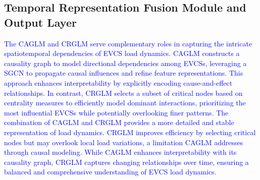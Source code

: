 \documentclass[lettersize,journal]{IEEEtran}
\newcommand{\hl}[1]{\textcolor{blue}{#1}}
\begin{document}
\subsection{Temporal Representation Fusion Module and Output Layer}


\hl{The CAGLM and CRGLM serve complementary roles in capturing the intricate spatiotemporal dependencies of EVCS load dynamics. CAGLM constructs a causality graph to model directional dependencies among EVCSs, leveraging a SGCN to propagate causal influences and refine feature representations. This approach enhances interpretability by explicitly encoding cause-and-effect relationships. In contrast, CRGLM selects a subset of critical nodes based on centrality measures to efficiently model dominant interactions, prioritizing the most influential EVCSs while potentially overlooking finer patterns.
The combination of CAGLM and CRGLM provides a more detailed and stable representation of load dynamics. CRGLM improves efficiency by selecting critical nodes but may overlook local load variations, a limitation CAGLM addresses through causal modeling. While CAGLM enhances interpretability with its causality graph, CRGLM captures changing relationships over time, ensuring a balanced and comprehensive understanding of EVCS load dynamics.}
\end{document}

